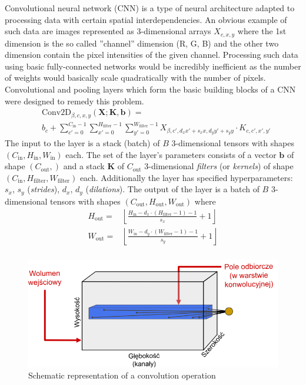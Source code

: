 \documentclass[a5paper]{article}
\begin{document}
Convolutional neural network (CNN) is a type of neural architecture adapted to processing data with
certain spatial interdependencies. An obvious example of such data are images represented as
3-dimensional arrays $X_{c,x,y}$ where the 1st dimension is the so called ''channel'' dimension (R,
G, B) and the other two dimension contain the pixel intensities of the given channel. Processing
such data using basic fully-connected networks would be incredibly inefficient as the number of
weights would basically scale quadratically with the number of pixels. Convolutional and pooling
layers which form the basic building blocks of a CNN were designed to remedy this problem.
\[
\begin{split}
   &\text{Conv2D}_{\beta,c,x,y}(\bm{X}; \bm{K}, \bm{b}) = \\
   & b_c + \sum_{c'=0}^{C_\text{in}-1} \sum_{x'=0}^{H_\text{filter}-1} \sum_{y'=0}^{W_\text{filter}-1} X_{\beta, c', d_x x' + s_x x, d_y y' + s_y y} \cdot K_{c,c',x',y'}   
\end{split}
\]
The input to the layer is a stack (batch) of $B$ 3-dimensional tensors with shapes $(C_\text{in},
H_\text{in}, W_\text{in})$ each. The set of the layer's parameters consists of a vector $\bm{b}$ of
shape $(C_\text{out},)$ and a stack $\bm{K}$ of $C_\text{out}$ 3-dimensional \emph{filters} (or
\emph{kernels}) of shape $(C_\text{in}, H_\text{filter}, W_\text{filter})$ each. Additionally the
layer has specified hyperparameters: $s_x$, $s_y$ (\emph{strides}), $d_x$, $d_y$ (\emph{dilations}).
The output of the layer is a batch of $B$ 3-dimensional tensors with shapes $(C_\text{out},
H_\text{out}, W_\text{out})$ where
\[
\begin{split}
   H_\text{out} =& \left\lfloor \frac{H_\text{in} - d_x \cdot (H_\text{filter} - 1) - 1}{s_x} + 1 \right\rfloor \\
   W_\text{out} =& \left\lfloor \frac{W_\text{in} - d_y \cdot (W_\text{filter} - 1) - 1}{s_y} + 1 \right\rfloor \\
\end{split}
\]
\begin{figure}[ht]
   \centering
   \includegraphics[width=0.8\columnwidth]{figs/conv2d.png}
   \caption{Schematic representation of a convolution operation \cite{Kurdziel}}
   \label{fig:conv2d}
\end{figure}
\end{document}
